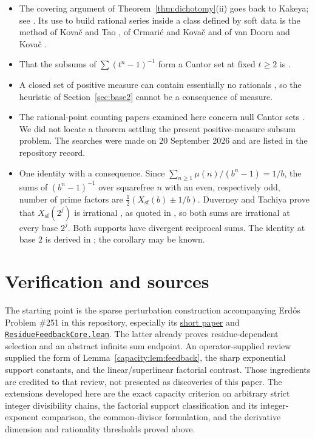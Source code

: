 \documentclass[11pt]{article}
\begin{document}
\begin{itemize}
\item The covering argument of Theorem~\ref{thm:dichotomy}(ii) goes back to Kakeya; see
  \cite{hornich1941,nitecki2013,fridy1966}.  Its use to build rational series
  inside a class defined by soft data is the method of Kova\v{c} and Tao
  \cite{kovactao2024}, of Crmari\'{c} and Kova\v{c} \cite{crmarickovac2025} and
  of van Doorn and Kova\v{c} \cite{vandoornkovac2025}.
\item That the subsums of $\sum(t^n-1)^{-1}$ form a Cantor set at fixed
  $t\ge2$ is \cite[Remark~4.1]{kovactao2024}.
\item A closed set of positive measure can contain essentially no rationals
  \cite{boesdarsterdos1981}, so the heuristic of Section~\ref{sec:base2} cannot be
  a consequence of measure.
\item The rational-point counting papers examined here concern null Cantor
  sets \cite{rstw2019,chowvarjuyu2024}.  We did not locate a theorem settling
  the present positive-measure subsum problem.  The searches were made on
  20 September 2026 and are listed in the repository record.
\item One identity with a consequence.  Since
  $\sum_{n\ge1}\mu(n)/(b^n-1)=1/b$, the sums of $(b^n-1)^{-1}$ over squarefree
  $n$ with an even, respectively odd, number of prime factors are
  $\tfrac12(X_{\mathrm{sf}}(b)\pm1/b)$.  Duverney and Tachiya prove that
  $X_{\mathrm{sf}}(2^j)$ is irrational \cite[Corollary~1.2 and
  Example~1.1]{duverneytachiya}, as quoted in \cite[Section~6]{plectis257}, so
  both sums are irrational at every base $2^j$.  Both supports have divergent
  reciprocal sums.  The identity at base $2$ is derived in
  \cite[Section~5]{plectis249}; the corollary may be known.
\end{itemize}


\section{Verification and sources}\label{capacity:sec:sources}
The starting point is the sparse perturbation construction accompanying
Erd\H{o}s Problem \#251 in this repository, especially its
\href{erdos-251-prime-gap-dyadic-series.pdf}{short paper} and
\href{\repobase/lean/ErdosProblems/Erdos251/ResidueFeedbackCore.lean}{\texttt{ResidueFeedbackCore.lean}}.
The latter already proves residue-dependent selection and an abstract infinite
sum endpoint. An operator-supplied review supplied the form of
Lemma~\ref{capacity:lem:feedback}, the sharp exponential support constants, and the
linear/superlinear factorial contrast. Those ingredients are credited to that
review, not presented as discoveries of this paper. The extensions developed here are the exact capacity criterion on arbitrary
strict integer divisibility chains, the factorial support classification and
its integer-exponent comparison, the common-divisor formulation, and the
derivative dimension and rationality thresholds proved above.
\end{document}
